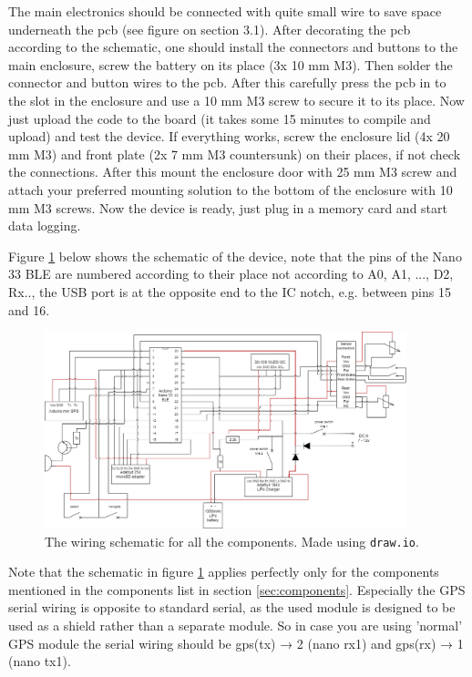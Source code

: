 \documentclass[a4paper,11pt]{article}
\begin{document}
The main electronics should be connected with quite small wire to save space underneath the pcb (see figure on section 3.1). After decorating the pcb according to the schematic, one should install the connectors and buttons to the main enclosure, screw the battery on its place (3x 10 mm M3). Then solder the connector and button wires to the pcb. After this carefully press the pcb in to the slot in the enclosure and use a 10 mm M3 screw to secure it to its place. Now just upload the code to the board (it takes some 15 minutes to compile and upload) and test the device. If everything works, screw the enclosure lid (4x 20 mm M3) and front plate (2x 7 mm M3 countersunk) on their places, if not check the connections. After this mount the enclosure door with 25 mm M3 screw and attach your preferred mounting solution to the bottom of the enclosure with 10 mm M3 screws. Now the device is ready, just plug in a memory card and start data logging.

Figure \ref{fig:schematic} below shows the schematic of the device, note that the pins of the Nano 33 BLE are numbered according to their place not according to A0, A1, ..., D2, Rx.., the USB port is at the opposite end to the IC notch, e.g. between pins 15 and 16.

\begin{figure}[H]
    \centering
    \includegraphics[width=105mm]{Figures/schematic.png}
    \caption{The wiring schematic for all the components. Made using \texttt{draw.io}.}
    \label{fig:schematic}
\end{figure}

Note that the schematic in figure \ref{fig:schematic} applies perfectly only for the components mentioned in the components list in section \ref{sec:components}. Especially the GPS serial wiring is opposite to standard serial, as the used module is designed to be used as a shield rather than a separate module. So in case you are using 'normal' GPS module the serial wiring should be gps(tx) → 2 (nano rx1) and gps(rx) → 1 (nano tx1).
\end{document}
